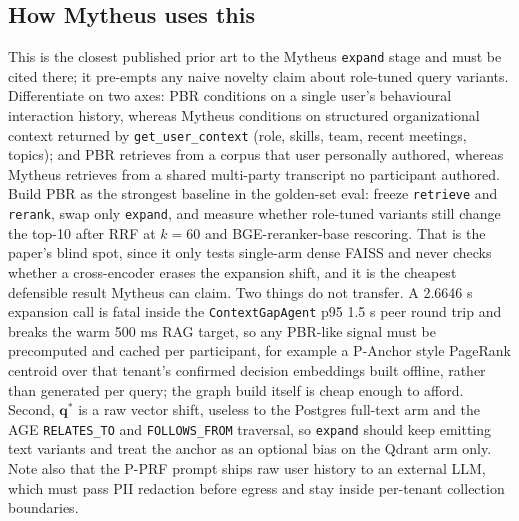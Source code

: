 \subsection{How Mytheus uses this}
\begin{takeaway}
This is the closest published prior art to the Mytheus \texttt{expand} stage and must be cited there; it pre-empts any naive novelty claim about role-tuned query variants. Differentiate on two axes: PBR conditions on a single user's behavioural interaction history, whereas Mytheus conditions on structured organizational context returned by \texttt{get\_user\_context} (role, skills, team, recent meetings, topics); and PBR retrieves from a corpus that user personally authored, whereas Mytheus retrieves from a shared multi-party transcript no participant authored. Build PBR as the strongest baseline in the golden-set eval: freeze \texttt{retrieve} and \texttt{rerank}, swap only \texttt{expand}, and measure whether role-tuned variants still change the top-10 after RRF at $k=60$ and BGE-reranker-base rescoring. That is the paper's blind spot, since it only tests single-arm dense FAISS and never checks whether a cross-encoder erases the expansion shift, and it is the cheapest defensible result Mytheus can claim. Two things do not transfer. A 2.6646 s expansion call is fatal inside the \texttt{ContextGapAgent} p95 1.5 s peer round trip and breaks the warm 500 ms RAG target, so any PBR-like signal must be precomputed and cached per participant, for example a P-Anchor style PageRank centroid over that tenant's confirmed decision embeddings built offline, rather than generated per query; the graph build itself is cheap enough to afford. Second, $\mathbf{q}^{*}$ is a raw vector shift, useless to the Postgres full-text arm and the AGE \texttt{RELATES\_TO} and \texttt{FOLLOWS\_FROM} traversal, so \texttt{expand} should keep emitting text variants and treat the anchor as an optional bias on the Qdrant arm only. Note also that the P-PRF prompt ships raw user history to an external LLM, which must pass PII redaction before egress and stay inside per-tenant collection boundaries.
\end{takeaway}

